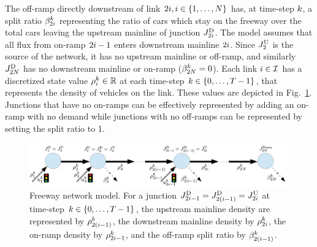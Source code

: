The off-ramp directly downstream of link $2i,i\in\left\{ 1,\ldots,N\right\}$
has, at time-step $k$, a split ratio $\beta_{2i}^{k}$
representing the ratio of cars which stay on the freeway over the
total cars leaving the upstream mainline of junction $J_{2i}^{\text{D}}$.
The model assumes that all flux from on-ramp $2i-1$ enters downstream
mainline $2i$. Since $J_{2}^{\text{U}}$ is the source of the network,
it has no upstream mainline or off-ramp, and similarly $J_{2N}^{\text{D}}$
has no downstream mainline or on-ramp ($\beta_{2N}^{k}=0$).
Each link $i\in\mathcal{I}$ has a discretized state value $\rho_{i}^{k}\in\mathbb{R}$
at each time-step $k\in\left\{ 0,\ldots,T-1\right\}$, that represents
the density of vehicles on the link. These values are depicted in
Fig.~\ref{fig:Freeway-network-junction}. Junctions that have no
on-ramps can be effectively represented by adding an on-ramp with no
demand while junctions with no off-ramps can be represented by setting
the split ratio to 1.
\begin{figure}
\begin{centering}
\includegraphics[width=1\columnwidth]{figs-gen/rm-junction-2}
\par\end{centering}

\caption{Freeway network model. For a junction $J_{2i-1}^{\text{D}}=J_{2\left(i-1\right)}^{\text{D}}=J_{2i}^{\text{U}}$
at time-step $k\in\left\{ 0,\ldots,T-1\right\}$, the upstream mainline
density are represented by $\rho_{2\left(i-1\right)}^{k}$,
the downstream mainline density by $\rho_{2i}^{k}$,
the on-ramp density by $\rho_{2i-1}^{k}$, and the
off-ramp split ratio by $\beta_{2\left(i-1\right)}^{k}$.\label{fig:Freeway-network-junction}}
\end{figure}


